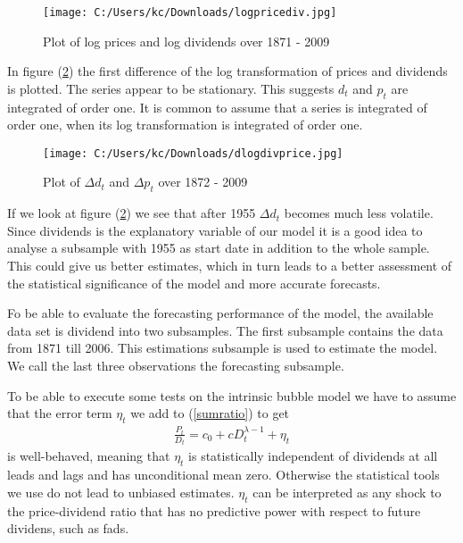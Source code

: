 \documentclass{article}
\begin{document}
\begin{figure}[t!]
	\centering	\texttt{[image: C:/Users/kc/Downloads/logpricediv.jpg]}
	\caption{Plot of log prices and log dividends over 1871 - 2009}
	\label{lnpricediv}
\end{figure}

In figure (\ref{dlnpricediv}) the first difference of the log transformation of prices and dividends is plotted. The series appear to be stationary. This suggests $d_t$ and $p_t$ are integrated of order one. It is common to assume that a series is integrated of order one, when its log transformation  is integrated of order one. 

\begin{figure}[h!]
	\centering
		\texttt{[image: C:/Users/kc/Downloads/dlogdivprice.jpg]}
	\caption{Plot of $\Delta d_t$ and $\Delta p_t$ over 1872 - 2009}
	\label{dlnpricediv}
\end{figure}

If we look at figure (\ref{dlnpricediv}) we see that after 1955 $\Delta d_t$ becomes much less volatile. Since dividends is the explanatory variable of our model it is a good idea to analyse a subsample with 1955 as start date in addition to the whole sample.	 This could give us better estimates, which in turn leads to a better assessment of the statistical significance of the model and more accurate forecasts. 

Fo be able to evaluate the forecasting performance of the model, the available data set is dividend into two subsamples. The first subsample contains the data from 1871 till 2006. This estimations subsample is used to estimate the model. We call the last three observations the forecasting subsample.
\newpage
	
To be able to execute some tests on the intrinsic bubble model we have to assume that the error  term $\eta_t$ we add to (\ref{sumratio}) to get
\begin{eqnarray}
\frac{P_t}{D_t} =  c_0  + c D_t^{\lambda - 1} + \eta_t \label{intrinsicmodel}
\end{eqnarray}
is well-behaved, meaning that $\eta_t$ is statistically independent of dividends at all leads and lags and has unconditional mean zero\footnotemark. Otherwise the statistical tools we use do not lead to unbiased estimates. $\eta_t$ can be interpreted as any shock to the price-dividend ratio that has no predictive power with respect to future dividens, such as fads. 
\end{document}
